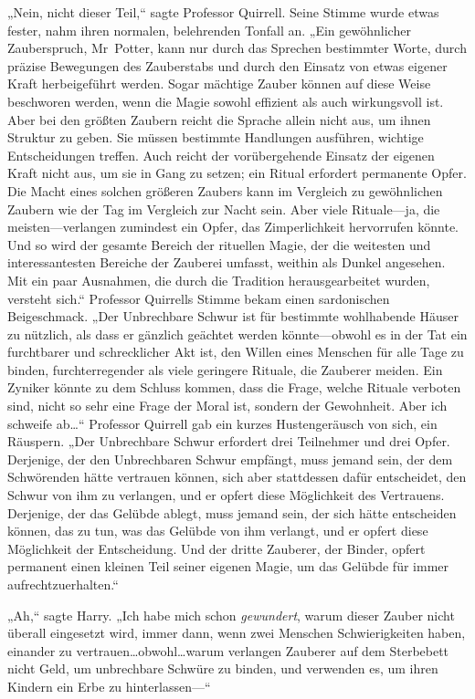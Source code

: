 „Nein, nicht dieser Teil,“ sagte Professor Quirrell. Seine Stimme wurde etwas fester, nahm ihren normalen, belehrenden Tonfall an. „Ein gewöhnlicher Zauberspruch, Mr~Potter, kann nur durch das Sprechen bestimmter Worte, durch präzise Bewegungen des Zauberstabs und durch den Einsatz von etwas eigener Kraft herbeigeführt werden. Sogar mächtige Zauber können auf diese Weise beschworen werden, wenn die Magie sowohl effizient als auch wirkungsvoll ist. Aber bei den größten Zaubern reicht die Sprache allein nicht aus, um ihnen Struktur zu geben. Sie müssen bestimmte Handlungen ausführen, wichtige Entscheidungen treffen. Auch reicht der vorübergehende Einsatz der eigenen Kraft nicht aus, um sie in Gang zu setzen; ein Ritual erfordert permanente Opfer. Die Macht eines solchen größeren Zaubers kann im Vergleich zu gewöhnlichen Zaubern wie der Tag im Vergleich zur Nacht sein. Aber viele Rituale—ja, die meisten—verlangen zumindest ein Opfer, das Zimperlichkeit hervorrufen könnte. Und so wird der gesamte Bereich der rituellen Magie, der die weitesten und interessantesten Bereiche der Zauberei umfasst, weithin als Dunkel angesehen. Mit ein paar Ausnahmen, die durch die Tradition herausgearbeitet wurden, versteht sich.“ Professor Quirrells Stimme bekam einen sardonischen Beigeschmack. „Der Unbrechbare Schwur ist für bestimmte wohlhabende Häuser zu nützlich, als dass er gänzlich geächtet werden könnte—obwohl es in der Tat ein furchtbarer und schrecklicher Akt ist, den Willen eines Menschen für alle Tage zu binden, furchterregender als viele geringere Rituale, die Zauberer meiden. Ein Zyniker könnte zu dem Schluss kommen, dass die Frage, welche Rituale verboten sind, nicht so sehr eine Frage der Moral ist, sondern der Gewohnheit. Aber ich schweife ab…“ Professor Quirrell gab ein kurzes Hustengeräusch von sich, ein Räuspern. „Der Unbrechbare Schwur erfordert drei Teilnehmer und drei Opfer. Derjenige, der den Unbrechbaren Schwur empfängt, muss jemand sein, der dem Schwörenden hätte vertrauen können, sich aber stattdessen dafür entscheidet, den Schwur von ihm zu verlangen, und er opfert diese Möglichkeit des Vertrauens. Derjenige, der das Gelübde ablegt, muss jemand sein, der sich hätte entscheiden können, das zu tun, was das Gelübde von ihm verlangt, und er opfert diese Möglichkeit der Entscheidung. Und der dritte Zauberer, der Binder, opfert permanent einen kleinen Teil seiner eigenen Magie, um das Gelübde für immer aufrechtzuerhalten.“

„Ah,“ sagte Harry. „Ich habe mich schon \emph{gewundert}, warum dieser Zauber nicht überall eingesetzt wird, immer dann, wenn zwei Menschen Schwierigkeiten haben, einander zu vertrauen…obwohl…warum verlangen Zauberer auf dem Sterbebett nicht Geld, um unbrechbare Schwüre zu binden, und verwenden es, um ihren Kindern ein Erbe zu hinterlassen—“

